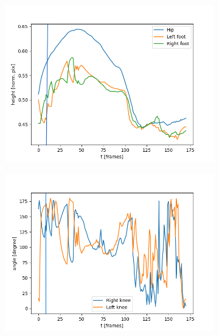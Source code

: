 \begin{figure}[h!]
\begin{subfigure}[b]{0.5\textwidth}
        \label{subfig:runup_jump_landing_angles}
    \end{subfigure}
    \begin{subfigure}[b]{0.5\textwidth}
        \includegraphics*[scale=0.45]{jump_no_runup.png}
        \label{subfig:no_runup_height}
    \end{subfigure}
    \hfill
    \begin{subfigure}[b]{0.5\textwidth}
        \includegraphics*[scale=0.45]{jump_no_runup_angles.png}
        \label{subfig:no_runup_angles}
    \end{subfigure}
    \begin{subfigure}[b]{0.5\textwidth}

\end{subfigure}
\end{figure}
